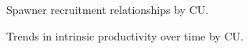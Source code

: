 \documentclass[11pt]{book}
\begin{document}
\begin{figure}[htb]

{\centering {} 

}

\caption{Spawner recruitment relationships by CU.}\label{fig:fig-CU-SR}
\end{figure}

\begin{figure}[htb]

{\centering {} 

}

\caption{Trends in intrinsic productivity over time by CU.}\label{fig:fig-prod-trends}
\end{figure}
\end{document}
